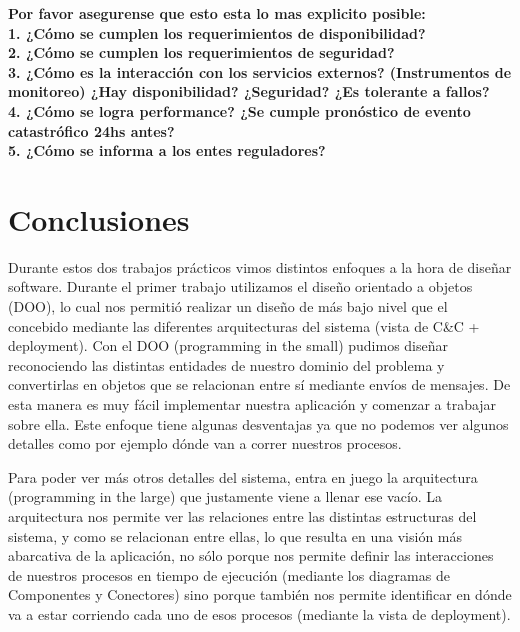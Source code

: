 \documentclass{article}
\theoremstyle{definition}
\theoremstyle{remark}
\begin{document}
\textbf{Por favor asegurense que esto esta lo mas explicito posible:\\
1. ¿Cómo se cumplen los requerimientos de disponibilidad?\\
2. ¿Cómo se cumplen los requerimientos de seguridad?\\
3. ¿Cómo es la interacción con los servicios externos? (Instrumentos de monitoreo) ¿Hay disponibilidad? ¿Seguridad? ¿Es tolerante a fallos?\\
4. ¿Cómo se logra performance? ¿Se cumple pronóstico de evento catastrófico 24hs antes?\\
5. ¿Cómo se informa a los entes reguladores?}

\pagebreak

\section{Conclusiones}



Durante estos dos trabajos prácticos vimos distintos enfoques a la hora de diseñar software. Durante el primer trabajo utilizamos el diseño orientado a objetos (DOO), lo cual nos permitió realizar un diseño de más bajo nivel que el concebido mediante las diferentes arquitecturas del sistema (vista de C&C + deployment). Con el DOO (programming in the small) pudimos diseñar reconociendo las distintas entidades de nuestro dominio del problema y convertirlas en objetos que se relacionan entre sí mediante envíos de mensajes. De esta manera es muy fácil implementar nuestra aplicación y comenzar a trabajar sobre ella. Este enfoque tiene algunas desventajas ya que no podemos ver algunos detalles como por ejemplo dónde van a correr nuestros procesos.

Para poder ver más otros detalles del sistema, entra en juego la arquitectura (programming in the large) que justamente viene a llenar ese vacío. La arquitectura nos permite ver las relaciones entre las distintas estructuras del sistema, y como se relacionan entre ellas, lo que resulta en una visión más abarcativa de la aplicación, no sólo porque nos permite definir las interacciones de nuestros procesos en tiempo de ejecución (mediante los diagramas de Componentes y Conectores) sino porque también nos permite identificar en dónde va a estar corriendo cada uno de esos procesos (mediante la vista de deployment).
\end{document}
